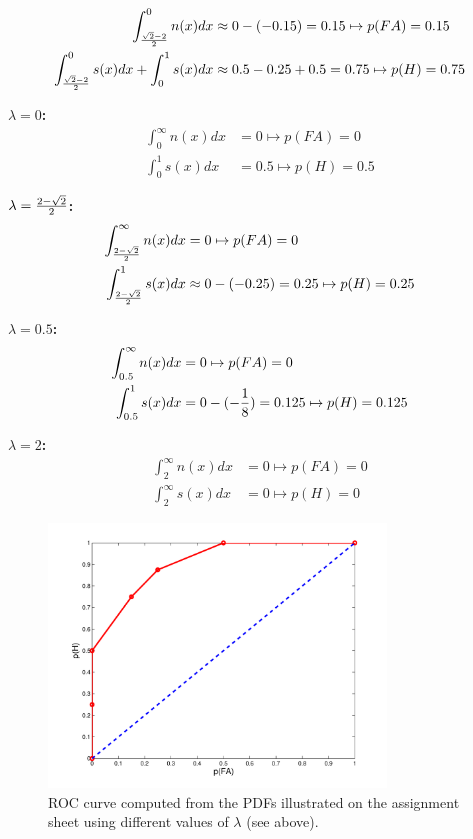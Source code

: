 \documentclass[a4paper]{scrartcl}
\begin{document}
\begin{align*}
\int_{{\sqrt{2}-2\over 2}}^0n(x)dx &\approx 0 - (-0.15) = 0.15 \mapsto p(FA) = 0.15  \\
\int_{\sqrt{2}-2\over 2}^0s(x)dx + \int_{0}^1s(x)dx &\approx 0.5 - 0.25 + 0.5 = 0.75 \mapsto p(H) = 0.75 
\end{align*}

\textbf{$\lambda = 0$:} \\

\begin{align*}
\int_{0}^\infty n(x)dx &= 0 \mapsto p(FA) = 0 \\
\int_{0}^1s(x)dx &= 0.5 \mapsto p(H) = 0.5
\end{align*}

\textbf{$\lambda = {2-\sqrt{2}\over 2}$:} \\

\begin{align*}
\int_{{2-\sqrt{2}\over 2}}^\infty n(x)dx &= 0 \mapsto p(FA) = 0 \\
\int_{2-\sqrt{2}\over 2}^1s(x)dx &\approx 0 - (-0.25) = 0.25 \mapsto p(H) = 0.25 
\end{align*}

\textbf{$\lambda = 0.5$:} \\

\begin{align*}
\int_{0.5}^\infty n(x)dx &= 0 \mapsto p(FA) = 0 \\
\int_{0.5}^1s(x)dx &= 0 - (-{1\over 8}) = 0.125 \mapsto p(H) = 0.125
\end{align*}

\textbf{$\lambda = 2$:} \\

\begin{align*}
\int_{2}^\infty n(x)dx &= 0 \mapsto p(FA) = 0 \\
\int_{2}^\infty s(x)dx &= 0 \mapsto p(H) = 0
\end{align*}

\begin{figure}[ht]
	\centering
		\includegraphics[width=0.8\textwidth]{roc.pdf}
	\caption{ROC curve computed from the PDFs illustrated on the assignment sheet using different values of $\lambda$ (see above).}
	\label{sg:fig:roc}
\end{figure}
\end{document}
